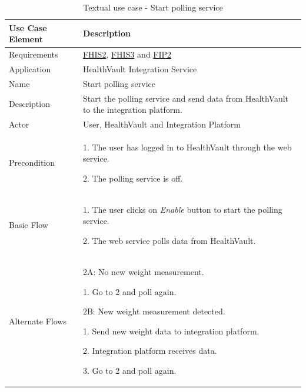 \begin{table}[H]
\begin{center}
\begin{tabular}{ l | p{10cm} }
  \hline
  \textbf{Use Case Element} & \textbf{Description} \\ \hline\hline
  Requirements & \hyperref[table:reqwebservice]{FHIS2}, \hyperref[table:reqwebservice]{FHIS3} and \hyperref[table:reqip]{FIP2}\\ \hline
  Application & HealthVault Integration Service \\ \hline
  Name & Start polling service \\ \hline
  Description & Start the polling service and send data from HealthVault to the integration platform. \\ \hline
  Actor & User, HealthVault and Integration Platform \\ \hline
  Precondition &
    \par 1. The user has logged in to HealthVault through the web service.
    \par 2. The polling service is off.
  \\ \hline
  Basic Flow & 
  	\par 1. The user clicks on \textit{Enable} button to start the polling service.
  	\par 2. The web service polls data from HealthVault.
  \\ \hline
   Alternate Flows & 
  	\par 2A: No new weight measurement.
  	\par\hspace{15pt} 1. Go to 2 and poll again.
  	\par 2B: New weight measurement detected.
  	\par\hspace{15pt} 1. Send new weight data to integration platform.
  	\par\hspace{15pt} 2. Integration platform receives data.
  	\par\hspace{15pt} 3. Go to 2 and poll again.
  \\ \hline
\end{tabular}
\end{center}
\caption{Textual use case - Start polling service}
\label{table:use-case-start-polling-service}
\end{table}


